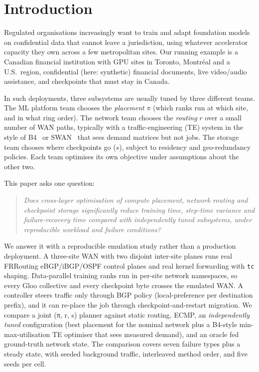 \section{Introduction}
\label{sec:intro}

Regulated organisations increasingly want to train and adapt foundation models on confidential data that
cannot leave a jurisdiction, using whatever accelerator capacity they own across a few metropolitan sites.
Our running example is a Canadian financial institution with GPU sites in Toronto, Montr\'eal and a U.S.\
region, confidential (here: synthetic) financial documents, live video/audio assistance, and checkpoints
that must stay in Canada.

In such deployments, three subsystems are usually tuned by three different teams. The ML platform team
chooses the \emph{placement} $\pi$ (which ranks run at which site, and in what ring order). The network team
chooses the \emph{routing} $r$ over a small number of WAN paths, typically with a traffic-engineering (TE)
system in the style of B4~\citep{b4} or SWAN~\citep{swan} that sees demand matrices but not jobs. The
storage team chooses where checkpoints go ($s$), subject to residency and geo-redundancy policies. Each
team optimises its own objective under assumptions about the other two.

This paper asks one question:
\begin{quote}\itshape
Does cross-layer optimisation of compute placement, network routing and checkpoint storage significantly
reduce training time, step-time variance and failure-recovery time compared with independently tuned
subsystems, under reproducible workload and failure conditions?
\end{quote}

We answer it with a reproducible emulation study rather than a production deployment. A three-site WAN with
two disjoint inter-site planes runs real FRRouting eBGP/iBGP/OSPF control planes and real kernel forwarding
with \texttt{tc} shaping. Data-parallel training ranks run in per-site network namespaces, so every Gloo
collective and every checkpoint byte crosses the emulated WAN. A controller steers traffic only through BGP
policy (local-preference per destination prefix), and it can re-place the job through
checkpoint-and-restart migration. We compare a joint (π, r, s) planner against static routing, ECMP, an
\emph{independently tuned} configuration (best placement for the nominal network plus a B4-style
min-max-utilisation TE optimiser that sees measured demand), and an oracle fed ground-truth network state.
The comparison covers seven failure types plus a steady state, with seeded background traffic,
interleaved method order, and five seeds per cell.

